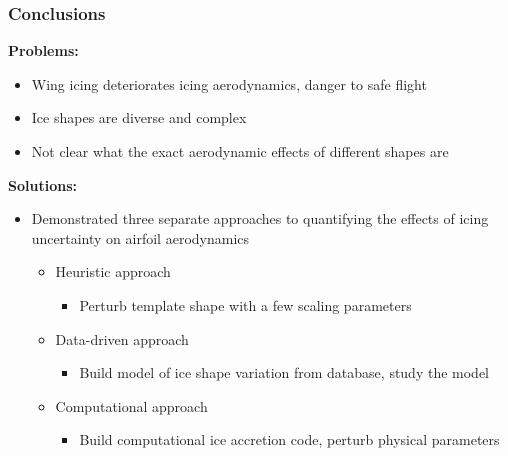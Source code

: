 \documentclass[9pt]{beamer}
\begin{document}
\begin{frame}
\frametitle{Conclusions}
\label{sec-3-7}

\textbf{Problems:}
\begin{itemize}
\item Wing icing deteriorates icing aerodynamics, danger to safe flight
\item Ice shapes are diverse and complex
\item Not clear what the exact aerodynamic effects of different shapes are
\end{itemize}
\textbf{Solutions:}
\begin{itemize}
\item Demonstrated three separate approaches to quantifying the effects of
  icing uncertainty on airfoil aerodynamics
\begin{itemize}
\item Heuristic approach
\begin{itemize}
\item Perturb template shape with a few scaling parameters
\end{itemize}
\item Data-driven approach
\begin{itemize}
\item Build model of ice shape variation from database, study the model
\end{itemize}
\item Computational approach
\begin{itemize}
\item Build computational ice accretion code, perturb physical parameters
\end{itemize}
\end{itemize}
\end{itemize}







 
\end{frame}
\end{document}
